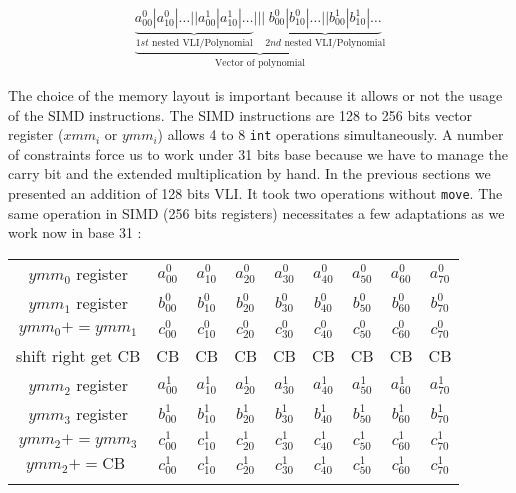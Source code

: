 \documentclass[11pt]{amsart}
\begin{document}
\begin{eqnarray}
 \underbrace{
 \underbrace{a^0_{00} | a^0_{10} | \dots || a^1_{00} | a^1_{10} | \dots  }_{1st  \textrm{ nested VLI/Polynomial} } |||  \underbrace{b^0_{00} | b^0_{10} | \dots || b^1_{00} | b^1_{10} | \dots  }_{2nd  \textrm{ nested VLI/Polynomial} }
 }_{\textrm{Vector of polynomial}} \nonumber
\end{eqnarray}

The choice of the memory layout is important because it allows or not the usage of the SIMD instructions. The SIMD instructions are 128 to 256 bits vector register ($xmm_i$ or $ymm_i$) allows 4 to 8 \texttt{int}  operations simultaneously.
A number of constraints force us to work under 31 bits base because we have to manage the carry bit and the extended multiplication by hand. In the previous sections we presented an addition of 128 bits VLI. It took two operations
without \texttt{move}.   The same operation in SIMD (256 bits registers) necessitates a few adaptations as we work now in base 31 :    

\begin{center}
\begin{tabular}{ c  c c c c c c c c} 
\\
 $ymm_0$   register      &    $a^0_{00}$  & $a^0_{10}$ & $a^0_{20}$  &  $a^0_{30}$ & $a^0_{40}$  &   $a^0_{50}$ &  $a^0_{60}$   & $a^0_{70}$  \\
 $ymm_1$   register      &    $b^0_{00}$  & $b^0_{10}$ & $b^0_{20}$  &  $b^0_{30}$ & $b^0_{40}$  &   $b^0_{50}$ &  $b^0_{60}$   & $b^0_{70}$  \\
$ymm_0 += ymm_1$    &    $c^0_{00}$  & $c^0_{10}$ & $c^0_{20}$  &  $c^0_{30}$  & $c^0_{40}$  &   $c^0_{50}$  &  $c^0_{60}$   & $c^0_{70}$  \\
shift right  get CB        &     CB                 & CB                & CB                 & CB                   & CB               &  CB                   & CB                   & CB \\
$ymm_2$   register      &    $a^1_{00}$  & $a^1_{10}$ & $a^1_{20}$  &  $a^1_{30}$ & $a^1_{40}$  &   $a^1_{50}$ &  $a^1_{60}$   & $a^1_{70}$  \\
 $ymm_3$   register      &    $b^1_{00}$  & $b^1_{10}$ & $b^1_{20}$  &  $b^1_{30}$ & $b^1_{40}$  &   $b^1_{50}$ &  $b^1_{60}$   & $b^1_{70}$  \\
$ymm_2 += ymm_3$     & $c^1_{00}$  & $c^1_{10}$ & $c^1_{20}$  &  $c^1_{30}$  & $c^1_{40}$  &   $c^1_{50}$  &  $c^1_{60}$   & $c^1_{70}$  \\                            
$ymm_2 +=  \textrm{CB } $ & $c^1_{00}$  & $c^1_{10}$ & $c^1_{20}$  &  $c^1_{30}$  & $c^1_{40}$  &   $c^1_{50}$  &  $c^1_{60}$   & $c^1_{70}$  \\                            
\\
\end{tabular}
\end{center}
\end{document}
